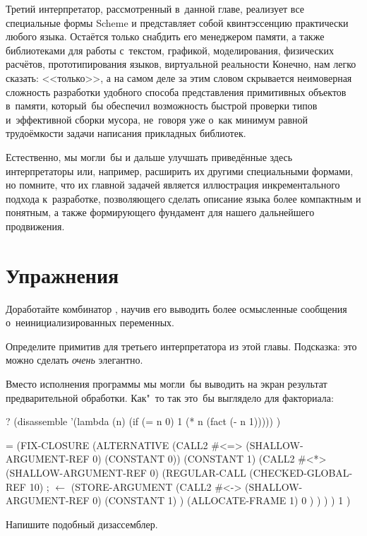 Третий интерпретатор, рассмотренный в~данной главе, реализует все специальные
формы Scheme и представляет собой квинтэссенцию практически любого языка.
Остаётся только снабдить его менеджером памяти, а также библиотеками для работы
с~текстом, графикой, моделирования, физических расчётов, прототипирования
языков, виртуальной реальности {\itd} Конечно, нам легко сказать: <<только>>,
а на самом деле за этим словом скрывается неимоверная сложность разработки
удобного способа представления примитивных объектов в~памяти, который~бы
обеспечил возможность быстрой проверки типов \cite{gud93} и~эффективной сборки
мусора, не~говоря уже о~как минимум равной трудоёмкости задачи написания
прикладных библиотек.

Естественно, мы могли~бы и дальше улучшать приведённые здесь интерпретаторы или,
например, расширить их другими специальными формами, но помните, что их главной
задачей является иллюстрация инкрементального подхода к~разработке, позволяющего
сделать описание языка более компактным и понятным, а также формирующего
фундамент для нашего дальнейшего продвижения.


\section{Упражнения}\label{fast/sect:exercises}

\begin{exercise}\label{fast/ex:symbol-table}
Доработайте комбинатор , научив его выводить более
осмысленные сообщения о~неинициализированных переменных.
\end{exercise}

\begin{exercise}\label{fast/ex:list}
Определите примитив  для третьего интерпретатора из этой главы.
Подсказка: это можно сделать \emph{очень} элегантно.
\end{exercise}

\begin{exercise}\label{fast/ex:disassemble}
Вместо исполнения программы мы могли~бы выводить на экран результат
предварительной обработки. Как"~то так это~бы выглядело для факториала:

\begin{code:lisp}
? (disassemble
    '(lambda (n) (if (= n 0) 1 (* n (fact (- n 1))))) )

= (FIX-CLOSURE
    (ALTERNATIVE
      (CALL2 #<=> (SHALLOW-ARGUMENT-REF 0) (CONSTANT 0))
      (CONSTANT 1)
      (CALL2 #<*> (SHALLOW-ARGUMENT-REF 0)
                  (REGULAR-CALL
                    (CHECKED-GLOBAL-REF 10)  ; $\leftarrow$ 
                    (STORE-ARGUMENT
                      (CALL2 #<-> (SHALLOW-ARGUMENT-REF 0)
                                  (CONSTANT 1) )
                      (ALLOCATE-FRAME 1)
                      0 ) ) ) )
    1 )
\end{code:lisp}

\noindent
Напишите подобный дизассемблер.
\end{exercise}

